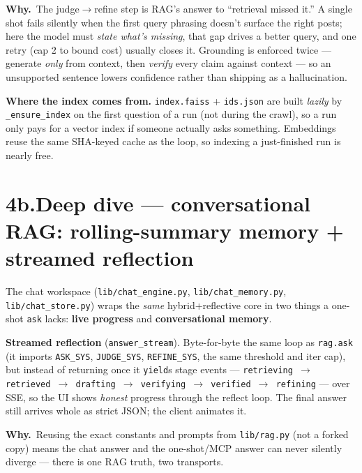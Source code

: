 \documentclass[11pt,a4paper]{article}
\newcommand{\why}[1]{%
  \par\vspace{2pt}%
  \noindent\colorbox{mist}{\begin{minipage}{\dimexpr\linewidth-2\fboxsep}%
  \textcolor{accent2}{\textbf{Why.}}~#1\end{minipage}}\par\vspace{3pt}}
\newcommand{\code}[1]{\texttt{\small #1}}
\begin{document}
\why{The judge$\rightarrow$refine step is RAG's answer to ``retrieval missed it.'' A single shot
fails silently when the first query phrasing doesn't surface the right posts; here the model must
\emph{state what's missing}, that gap drives a better query, and one retry (cap 2 to bound cost)
usually closes it. Grounding is enforced twice --- generate \emph{only} from context, then
\emph{verify} every claim against context --- so an unsupported sentence lowers confidence rather
than shipping as a hallucination.}

\smallskip
\noindent\textbf{Where the index comes from.} \code{index.faiss} + \code{ids.json} are built
\emph{lazily} by \code{\_ensure\_index} on the first question of a run (not during the crawl), so
a run only pays for a vector index if someone actually asks something. Embeddings reuse the same
SHA-keyed cache as the loop, so indexing a just-finished run is nearly free.

\section*{4b.\quad Deep dive --- conversational RAG: rolling-summary memory + streamed reflection}

The chat workspace (\code{lib/chat\_engine.py}, \code{lib/chat\_memory.py},
\code{lib/chat\_store.py}) wraps the \emph{same} hybrid+reflective core in two things a one-shot
\code{ask} lacks: \textbf{live progress} and \textbf{conversational memory}.

\smallskip
\noindent\textbf{Streamed reflection} (\code{answer\_stream}). Byte-for-byte the same loop as
\code{rag.ask} (it imports \code{ASK\_SYS}, \code{JUDGE\_SYS}, \code{REFINE\_SYS}, the same
threshold and iter cap), but instead of returning once it \code{yield}s stage events ---
\code{retrieving $\to$ retrieved $\to$ drafting $\to$ verifying $\to$ verified $\to$ refining} ---
over SSE, so the UI shows \emph{honest} progress through the reflect loop. The final answer still
arrives whole as strict JSON; the client animates it.
\why{Reusing the exact constants and prompts from \code{lib/rag.py} (not a forked copy) means the
chat answer and the one-shot/MCP answer can never silently diverge --- there is one RAG truth,
two transports.}
\end{document}
